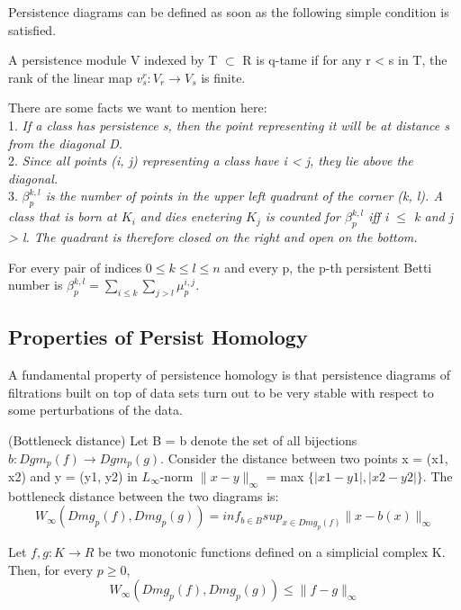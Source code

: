 Persistence diagrams can be defined as soon as the following simple condition is satisfied.
\begin{definition}
A persistence module V indexed by T $\subset$ R is q-tame if for any r < s in T, the rank of the linear map $v^r_s : V_r → V_s$ is finite.
\end{definition}

There are some facts we want to mention here: \\
1. \textit{If a class has persistence s, then the point representing it will be at distance s from the diagonal D.} \\ 
2. \textit{Since all points (i, j) representing a class have i < j, they lie above the diagonal.} \\ 
3. \textit{ $\beta^{k,l}_p$ is the number of points in the upper left quadrant of the corner (k, l). A class that is born at $K_i$ and dies enetering $K_j$ is counted for $\beta^{k,l}_p$ iff i $\leq$ k and j > l. The quadrant is therefore closed on the right and open on the bottom.}
\begin{definition}
For every pair of indices $0 \leq k \leq l \leq n$ and every p, the p-th persistent Betti number is $\beta^{k,l}_p = \sum_{i \leq k} \sum_{j > l} \mu_p^{i, j}$.  
\end{definition}

\subsection{Properties of Persist Homology}
A fundamental property of persistence homology is that persistence diagrams of filtrations built on top of data sets turn out to be very stable with respect to some perturbations of the data.
\begin{definition}(Bottleneck distance)
Let B = {b} denote the set of all bijections $b : Dgm_p( f ) \rightarrow Dgm_p(g)$. Consider the distance between two points x = (x1, x2) and y = (y1, y2) in $L_\infty$-norm $\lVert x-y \rVert _\infty$ = max $ \{ |x1-y1|, |x2-y2| \} $. The bottleneck distance between the two diagrams is:
\begin{equation*}
    W_\infty(Dmg_p(f), Dmg_p(g)) = inf_{b \in B} sup_{x \in Dmg_p(f)} \lVert x- b(x) \rVert_\infty
\end{equation*}
\end{definition}

\begin{theorem}
Let $f,g : K \rightarrow R$ be two monotonic functions defined on a simplicial complex K. Then, for every $p \geq 0$,
\begin{equation*}
    W_\infty(Dmg_p(f), Dmg_p(g)) \leq \lVert f - g \rVert_\infty
\end{equation*}
\end{theorem}
